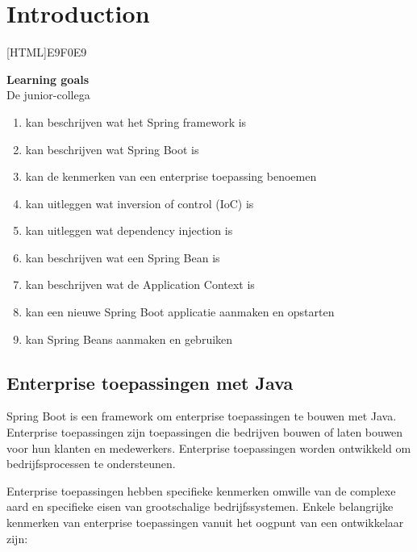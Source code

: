 \chapter{Introduction}
    
[HTML]{E9F0E9}{\parbox{\textwidth}{%
\noindent \textbf{Learning goals}\\
De junior-collega
\begin{enumerate}[nolistsep]
\item kan beschrijven wat het Spring framework is
\item kan beschrijven wat Spring Boot is
\item kan de kenmerken van een enterprise toepassing benoemen
\item kan uitleggen wat inversion of control (IoC) is
\item kan uitleggen wat dependency injection is
\item kan beschrijven wat een Spring Bean is
\item kan beschrijven wat de Application Context is
\item kan een nieuwe Spring Boot applicatie aanmaken en opstarten
\item kan Spring Beans aanmaken en gebruiken
\end{enumerate}}}


\section{Enterprise toepassingen met Java}

Spring Boot is een framework om enterprise toepassingen te bouwen met Java.
Enterprise toepassingen zijn toepassingen die bedrijven bouwen of laten bouwen voor hun klanten en medewerkers.  Enterprise toepassingen worden ontwikkeld om bedrijfsprocessen te ondersteunen. 

Enterprise toepassingen hebben specifieke kenmerken omwille van de complexe aard en specifieke eisen van grootschalige bedrijfssystemen.  Enkele belangrijke kenmerken van enterprise toepassingen vanuit het oogpunt van een ontwikkelaar zijn:

